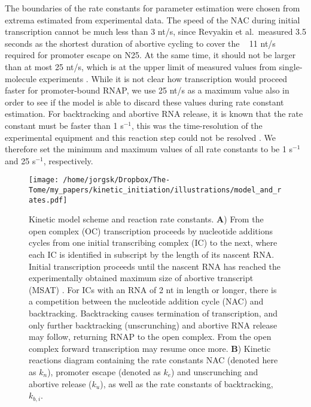 The boundaries of the rate constants for parameter estimation were chosen from
extrema estimated from experimental data. The speed of the NAC during initial
transcription cannot be much less than 3 nt/s, since Revyakin et al.\ measured
3.5 seconds as the shortest duration of abortive cycling
\cite{revyakin_abortive_2006} to cover the ~ 11 nt/s required for promoter
escape on N25. At the same time, it should not be larger than at most 25 nt/s,
which is at the upper limit of measured values from single-molecule
experiments \cite{bai_mechanochemical_2007}. While it is not clear how
transcription would proceed faster for promoter-bound RNAP, we use 25 nt/s as
a maximum value also in order to see if the model is able to discard these
values during rate constant estimation. For backtracking and abortive RNA
release, it is known that the rate constant must be faster than 1 s$^{-1}$,
this was the time-resolution of the experimental equipment and this reaction
step could not be resolved \cite{revyakin_abortive_2006}. We therefore set the
minimum and maximum values of all rate constants to be 1 s$^{-1}$ and 25
s$^{-1}$, respectively. 

\begin{figure}
	\begin{center}
        \texttt{[image: /home/jorgsk/Dropbox/The-Tome/my\_papers/kinetic\_initiation/illustrations/model\_and\_rates.pdf]}
	\end{center}
    \caption{Kinetic model scheme and reaction rate constants. \textbf{A})
    From the open complex (OC) transcription proceeds by nucleotide additions
    cycles from one initial transcribing complex (IC) to the next, where each
    IC is identified in subscript by the length of its nascent RNA. Initial
    transcription proceeds until the nascent RNA has reached the
    experimentally obtained maximum size of abortive transcript (MSAT)
    \cite{hsu_initial_2006}. For ICs with an RNA of 2 nt in length or longer, there is a
    competition between the nucleotide addition cycle (NAC) and backtracking.
    Backtracking causes termination of transcription, and only further
    backtracking (unscrunching) and abortive RNA release may follow, returning
    RNAP to the open complex. From the open complex forward transcription may
    resume once more. \textbf{B}) Kinetic reactions diagram containing the
    rate constants NAC (denoted here as $k_n$), promoter escape (denoted as
    $k_e$) and unscrunching and abortive release ($k_u$), as well as the rate
    constants of backtracking, $k_{b,i}$.}
    \label{fig:model_and_rates}
\end{figure}
